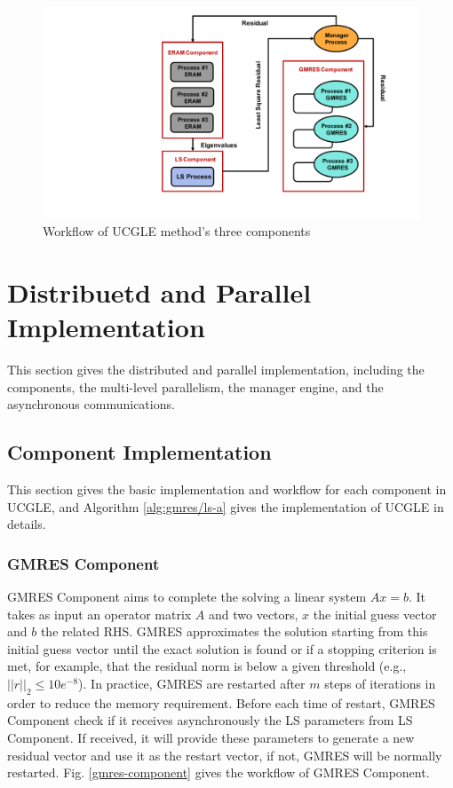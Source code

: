 \begin{figure}[htbp]
	\centering
	\includegraphics[width=5.2in]{fig/workflow.pdf}
	\caption{Workflow of UCGLE method's three components}
	\label{fig:worflow}
\end{figure}


\section{Distribuetd and Parallel Implementation}

This section gives the distributed and parallel implementation, including the components, the multi-level parallelism, the manager engine, and the asynchronous communications.
\subsection{Component Implementation}

This section gives the basic implementation and workflow for each component in UCGLE, and Algorithm \ref{alg:gmres/ls-a} gives the implementation of UCGLE in details.

\subsubsection{GMRES Component}

GMRES Component aims to complete the solving a linear system $Ax=b$. It takes as input an operator matrix $A$ and two vectors, $x$ the initial guess vector and $b$ the related RHS. GMRES approximates the solution starting from this initial guess vector until the exact solution is found or if a stopping criterion is met, for example, that the residual norm is below a given threshold (e.g., $||r||_2 \leq 10e^{-8}$). In practice, GMRES are restarted after $m$ steps of iterations in order to reduce the memory requirement. Before each time of restart, GMRES Component check if it receives asynchronously the LS parameters from LS Component. If received, it will provide these parameters to generate a new residual vector and use it as the restart vector, if not, GMRES will be normally restarted. Fig. \ref{gmres-component} gives the workflow of GMRES Component.

